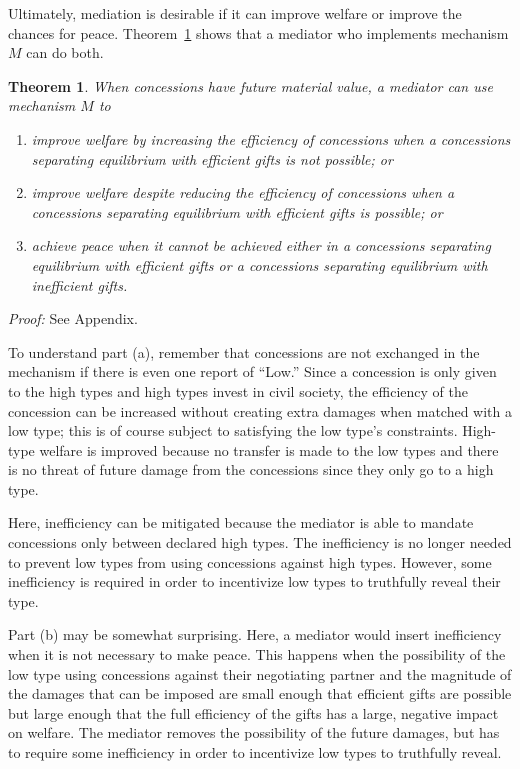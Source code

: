 \documentclass[12pt, letterpaper]{article}
\newtheorem{theorem}{Theorem}
\begin{document}
Ultimately, mediation is desirable if it can improve welfare or improve the chances for peace. Theorem~\ref{theorem:medwel} shows that a mediator who implements mechanism $M$ can do both.

\begin{theorem}
	When concessions have future material value, a mediator can use mechanism $M$ to
	\begin{enumerate}
		\item[(a)] improve welfare by increasing the efficiency of concessions when a \emph{concessions separating equilibrium with efficient gifts} is not possible; or
		\item[(b)] improve welfare despite reducing the efficiency of concessions when a \emph{concessions separating equilibrium with efficient gifts} is possible; or
		\item[(c)] achieve peace when it cannot be achieved either in a \emph{concessions separating equilibrium with efficient gifts} or a \emph{concessions separating equilibrium with inefficient gifts}.
	\end{enumerate}
	\label{theorem:medwel}
\end{theorem}
\emph{Proof:} See Appendix.

To understand part (a), remember that concessions are not exchanged in the mechanism if there is even one report of ``Low.'' Since a concession is only given to the high types and high types invest in civil society, the efficiency of the concession can be increased without creating extra damages when matched with a low type; this is of course subject to satisfying the low type's constraints. High-type welfare is improved because no transfer is made to the low types and there is no threat of future damage from the concessions since they only go to a high type.

Here, inefficiency can be mitigated because the mediator is able to mandate concessions only between declared high types. The inefficiency is no longer needed to prevent low types from using concessions against high types. However, some inefficiency is required in order to incentivize low types to truthfully reveal their type.

Part (b) may be somewhat surprising. Here, a mediator would insert inefficiency when it is not necessary to make peace. This happens when the possibility of the low type using concessions against their negotiating partner and the magnitude of the damages that can be imposed are small enough that efficient gifts are possible but large enough that the full efficiency of the gifts has a large, negative impact on welfare. The mediator removes the possibility of the future damages, but has to require some inefficiency in order to incentivize low types to truthfully reveal.
\end{document}
